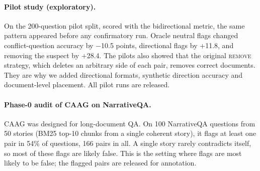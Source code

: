 \paragraph{Pilot study (exploratory).}
On the 200-question pilot split, scored with the bidirectional metric, the same pattern appeared before any
confirmatory run. Oracle neutral flags changed conflict-question accuracy by $-$10.5 points, directional flags by
$+$11.8, and removing the suspect by $+$28.4. The pilots also showed that the original \textsc{remove} strategy,
which deletes an arbitrary side of each pair, removes correct documents. They are why we added directional formats,
synthetic direction accuracy and document-level placement. All pilot runs are released.

\paragraph{Phase-0 audit of CAAG on NarrativeQA.}
CAAG was designed for long-document QA. On 100 NarrativeQA \citep{kocisky2018narrativeqa} questions from 50 stories
(BM25 top-10 chunks from a single coherent story), it flags at least one pair in 54\% of questions, 166 pairs in all.
A single story rarely contradicts itself, so most of these flags are likely false. This is the setting where flags
are most likely to be false; the flagged pairs are released for annotation.
